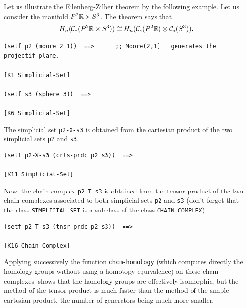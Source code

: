 Let us  illustrate the Eilenberg-Zilber theorem by the following example. 
Let us consider the manifold $P^2{{\Bbb R}}\times S^3$. The theorem says that
$$H_n({\cal C}_*(P^2{{\Bbb R}}\times S^3)) \cong H_n({\cal C}_*(P^2{{\Bbb R}}) \otimes {\cal C}_*(S^3)).$$
{\footnotesize\begin{verbatim}
(setf p2 (moore 2 1))  ==>      ;; Moore(2,1)   generates the projectif plane.

[K1 Simplicial-Set]

(setf s3 (sphere 3))  ==>

[K6 Simplicial-Set]
\end{verbatim}}
The simplicial set {\tt p2-X-s3} is obtained from the cartesian product of
the two simplicial sets {\tt p2} and {\tt s3}.
{\footnotesize\begin{verbatim}
(setf p2-X-s3 (crts-prdc p2 s3))  ==>

[K11 Simplicial-Set]
\end{verbatim}}
Now, the chain complex {\tt p2-T-s3} is obtained from the tensor product of
the two chain complexes associated to both simplicial sets {\tt p2} and {\tt s3} (don't forget that the class
{\tt SIMPLICIAL SET} is a subclass of the class {\tt CHAIN COMPLEX}).
{\footnotesize\begin{verbatim}
(setf p2-T-s3 (tnsr-prdc p2 s3))  ==>

[K16 Chain-Complex]
\end{verbatim}}
Applying  successively the  function {\tt chcm-homology} (which computes directly the
homology groups without using a homotopy equivalence)  on these chain
complexes, shows that  the homology groups are  effectively isomorphic,
but the method  of the tensor  product is  much faster than the
method of the simple cartesian product, the number of generators being much more 
smaller.
